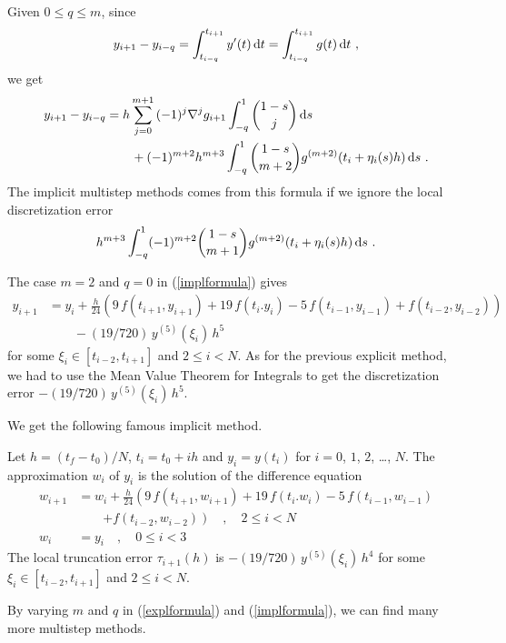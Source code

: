 Given $0\leq q \leq m$, since
\[
y_{i+1} - y_{i-q} = \int_{t_{i-q}}^{t_{i+1}} y'(t)\,\mathrm{d}t
= \int_{t_{i-q}}^{t_{i+1}} g(t)\,\mathrm{d}t \ ,
\]
we get
\begin{equation} \label{implformula}
\begin{split} 
y_{i+1} - y_{i-q} &= 
h \sum_{j=0}^{m+1}\,(-1)^j \nabla^j g_{i+1} \int_{-q}^1  \binom{1-s}{j}
\,\mathrm{d}s \\
& \qquad + (-1)^{m+2} h^{m+3} \int_{-q}^1 \binom{1-s}{m+2}
g^{(m+2)}(t_i+\eta_i(s)h) \,\mathrm{d}s \ .
\end{split}
\end{equation}
The implicit multistep methods comes from this formula if we ignore
the local discretization error
\[
h^{m+3} \int_{-q}^1 (-1)^{m+2} \binom{1-s}{m+1}
g^{(m+2)}(t_i+\eta_i(s)h) \,\mathrm{d}s \ .
\]

The case $m=2$ and $q=0$ in (\ref{implformula}) gives
\begin{align*}
y_{i+1} & = y_i + \frac{h}{24} \left( 9\, f(t_{i+1},y_{i+1}) + 19 \,
f(t_i.y_i) - 5 \,f(t_{i-1},y_{i-1}) + f(t_{i-2},y_{i-2})\right) \\
&\qquad  -(19/720) \,y^{(5)}(\xi_i)\,h^5
\end{align*}
for some $\xi_i \in [t_{i-2},t_{i+1}]$ and $2 \leq i < N$.
As for the previous explicit method, we had to use the Mean Value
Theorem for Integrals to get the discretization error
$-(19/720) \,y^{(5)}(\xi_i)\,h^5$.

We get the following famous implicit method.

\begin{defn}
Let $h=(t_f-t_0)/N$, $t_i=t_0+ih$ and $y_i = y(t_i)$ for $i=0$,
$1$, $2$, \ldots, $N$.  The approximation $w_i$ of $y_i$ is the
solution of the difference equation
\begin{align*}
w_{i+1} & = w_i + \frac{h}{24} \left( 9\, f(t_{i+1},w_{i+1}) + 19 \,
f(t_i.w_i)  - 5 \,f(t_{i-1},w_{i-1}) \right . \\
& \qquad \left. + f(t_{i-2},w_{i-2})\right) \quad, \quad 2 \leq i < N \\
w_i &= y_i \quad, \quad 0 \leq i < 3
\end{align*}
The local truncation error $\tau_{i+1}(h)$ is
$-(19/720) \,y^{(5)}(\xi_i)\,h^4$ for some
$\xi_i \in [t_{i-2},t_{i+1}]$ and $2 \leq i < N$.
\label{AMTSM}
\end{defn}

By varying $m$ and $q$ in (\ref{explformula}) and
(\ref{implformula}), we can find many more multistep methods.

